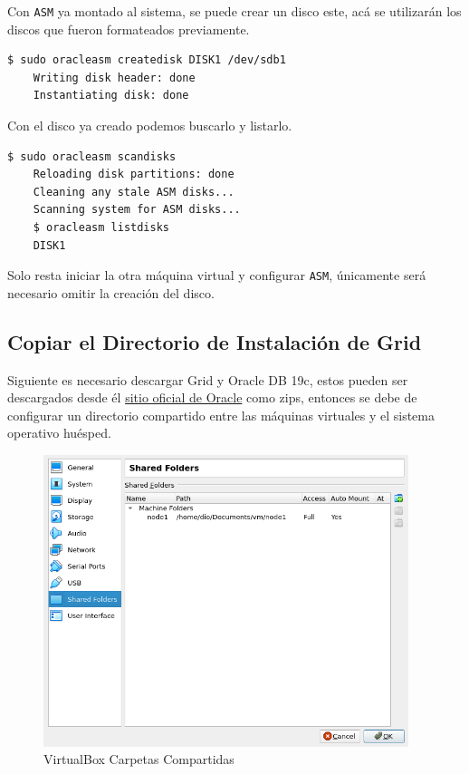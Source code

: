 \documentclass{article}
\begin{document}
Con \texttt{ASM} ya montado al sistema, se puede crear un disco este, acá se utilizarán los discos que fueron formateados previamente.

\begin{lstlisting}[style=mystyle,language=bash]
	$ sudo oracleasm createdisk DISK1 /dev/sdb1
	Writing disk header: done
	Instantiating disk: done
\end{lstlisting}

Con el disco ya creado podemos buscarlo y listarlo.

\begin{lstlisting}[style=mystyle,language=bash]
	$ sudo oracleasm scandisks
	Reloading disk partitions: done
	Cleaning any stale ASM disks...
	Scanning system for ASM disks...
	$ oracleasm listdisks
	DISK1
\end{lstlisting}

Solo resta iniciar la otra máquina virtual y configurar \texttt{ASM}, únicamente será necesario omitir la creación del disco.

\subsection{Copiar el Directorio de Instalación de Grid}

Siguiente es necesario descargar Grid y Oracle DB 19c, estos pueden ser descargados desde él \hyperlink{https://www.oracle.com/in/database/technologies/oracle19c-linux-downloads.html}{sitio oficial de Oracle} como zips, entonces se debe de configurar un directorio compartido entre las máquinas virtuales y el sistema operativo huésped.

\begin{figure}[H]
		\begin{center}
			\includegraphics[width=0.95\textwidth]{vm_shared_folder.png}
		\end{center}
		\caption{VirtualBox Carpetas Compartidas}
\end{figure}
\end{document}
